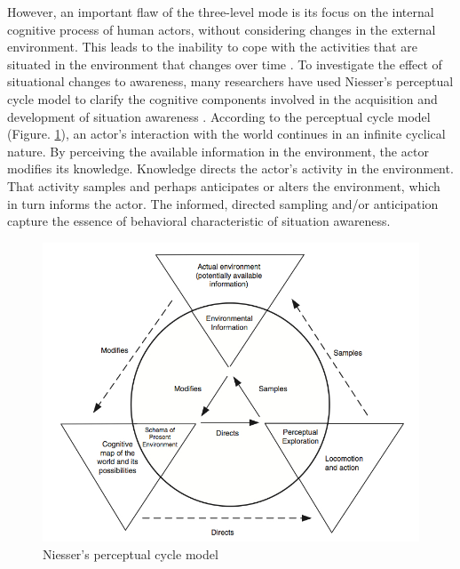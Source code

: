However, an important flaw of the three-level mode is its focus on the internal cognitive process of human actors, without considering changes in the external environment. This leads to the inability to cope with the activities that are situated in the environment that changes over time \cite{Smith1995,uhlarik2002review}. To investigate the effect of situational changes to awareness, many researchers have used Niesser's perceptual cycle model \cite{neisser1976cognition} to clarify the cognitive components involved in the acquisition and development of situation awareness \cite{Smith1995,Adams1995,Gutwin2002,Stanton2009}. According to the perceptual cycle model (Figure. \ref{fig:perceptual_cycle}), an actor's interaction with the world continues in an infinite cyclical nature. By perceiving the available information in the environment, the actor modifies its knowledge. Knowledge directs the actor's activity in the environment. That activity samples and perhaps anticipates or alters the environment, which in turn informs the actor. The informed, directed sampling and/or anticipation capture the essence of behavioral characteristic of situation awareness.

\begin{figure}[htbp] %
   \centering
   \includegraphics[width=4.5in]{perceptual_cycle.jpg} 
   \caption{Niesser's perceptual cycle model \cite{Salmon2008}}
   \label{fig:perceptual_cycle}
\end{figure}

